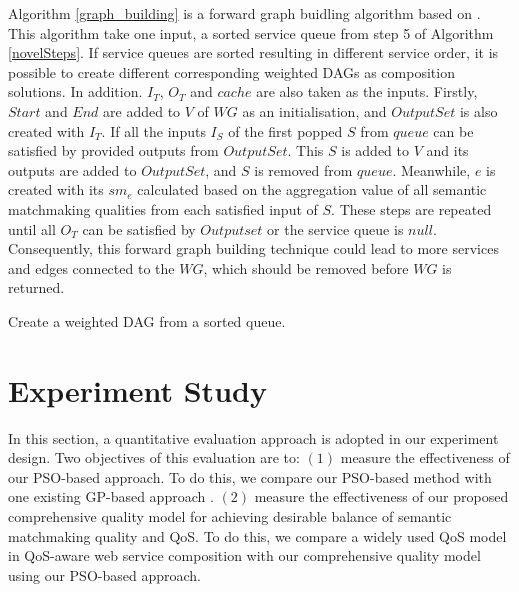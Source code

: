 \documentclass{llncs}
\begin{document}
Algorithm  \ref{graph_building} is a forward graph buidling algorithm based on \cite{blum1997fast}. This algorithm take one input, a sorted service queue from step 5 of Algorithm \ref{novelSteps}. If service queues are sorted resulting in different service order, it is possible to create different corresponding weighted DAGs as composition solutions. In addition. $I_{T}$, $O_{T}$ and $cache$ are also taken as the inputs. Firstly, $Start$ and $End$ are added to $V$ of $WG$ as an initialisation, and $OutputSet$ is also created with $I_{T}$.  If all the inputs $I_{S}$ of the first popped  $S$ from $queue$ can be satisfied by provided outputs from $OutputSet$. This $S$ is added to $V$ and its outputs are added to $OutputSet$, and $S$ is removed from $queue$. Meanwhile, $e$ is created with its $sm_{e}$ calculated based on the aggregation value of all semantic matchmaking qualities from each satisfied input of $S$. These steps are repeated until all  $O_{T}$ can be satisfied by $Outputset$ or the service queue is $null$. Consequently, this forward graph building technique could lead to more services and edges connected to the $WG$, which should be removed before $WG$ is returned.

\begin{algorithm}
 \SetNlSty{}{}{:}
 \caption{Create a weighted DAG from a  sorted queue.}
\label{graph_building}
\end{algorithm} 


\section{Experiment Study}\label{experiment_design}
In this section, a quantitative evaluation approach is adopted in our experiment design. Two objectives of this evaluation are to: $(1)$ measure the effectiveness of our PSO-based approach. To do this, we compare our PSO-based method with one existing GP-based approach \cite{ma2015hybrid}. $(2)$ measure the effectiveness of our proposed comprehensive quality model for achieving desirable balance of semantic matchmaking quality and QoS. To do this, we compare a widely used QoS model in QoS-aware web service composition \cite{ma2015hybrid,da2016particle,da2015graphevol} with our comprehensive quality model using our PSO-based approach.
\end{document}
